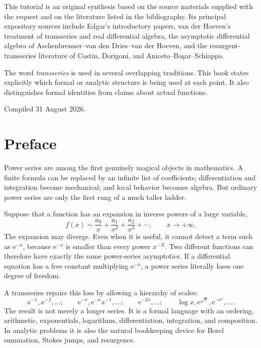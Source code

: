 \documentclass[11pt,openany]{book}
\theoremstyle{definition}
\theoremstyle{plain}
\theoremstyle{remark}
\newcommand{\e}{\mathrm{e}}
\newcommand{\asym}{\sim}
\begin{document}
\thispagestyle{empty}
\vspace*{\fill}
\begin{center}
\begin{minipage}{0.82\textwidth}
\small
This tutorial is an original synthesis based on the source materials supplied with the request and on the literature listed in the bibliography. Its principal expository sources include Edgar's introductory papers, van der Hoeven's treatment of transseries and real differential algebra, the asymptotic differential algebra of Aschenbrenner--van den Dries--van der Hoeven, and the resurgent-transseries literature of Costin, Dorigoni, and Aniceto--Ba\c{s}ar--Schiappa.

\medskip
The word \emph{transseries} is used in several overlapping traditions. This book states explicitly which formal or analytic structure is being used at each point. It also distinguishes formal identities from claims about actual functions.

\medskip
Compiled 31 August 2026.
\end{minipage}
\end{center}
\vspace*{\fill}
\cleardoublepage

\chapter*{Preface}

Power series are among the first genuinely magical objects in mathematics. A finite formula can be replaced by an infinite list of coefficients; differentiation and integration become mechanical; and local behavior becomes algebra. But ordinary power series are only the first rung of a much taller ladder.

Suppose that a function has an expansion in inverse powers of a large variable,
\[
 f(x)\asym \frac{a_0}{x}+\frac{a_1}{x^2}+\frac{a_2}{x^3}+\cdots,
 \qquad x\to+\infty.
\]
The expansion may diverge. Even when it is useful, it cannot detect a term such as $\e^{-x}$, because $\e^{-x}$ is smaller than every power $x^{-N}$. Two different functions can therefore have exactly the same power-series asymptotics. If a differential equation has a free constant multiplying $\e^{-x}$, a power series literally loses one degree of freedom.

A transseries repairs this loss by allowing a hierarchy of scales:
\[
 x^{-1},x^{-2},\ldots;
 \qquad \e^{-x},\e^{-x}x^{-1},\ldots;
 \qquad \e^{-2x},\ldots;
 \qquad \log x,\e^{\sqrt{x}},\e^{-\e^x},\ldots.
\]
The result is not merely a longer series. It is a formal language with an ordering, arithmetic, exponentials, logarithms, differentiation, integration, and composition. In analytic problems it is also the natural bookkeeping device for Borel summation, Stokes jumps, and resurgence.
\end{document}
